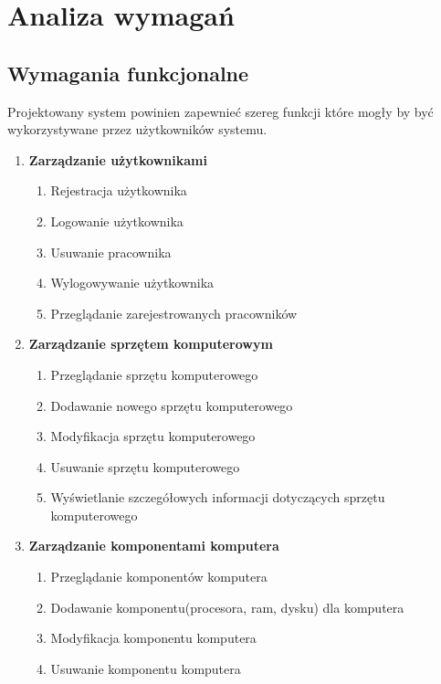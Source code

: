 \chapter{Analiza wymagań}

\section{Wymagania funkcjonalne}

Projektowany system powinien zapewnieć szereg funkcji które mogły by być wykorzystywane przez użytkowników systemu.
\begin{enumerate}[label={\textbf{FR}-\bfseries\arabic*}]
    \item \textbf{Zarządzanie użytkownikami}
    \begin{enumerate}[label={FR-\arabic{enumi}.\arabic*},noparskip]
        \item Rejestracja użytkownika
        \item Logowanie użytkownika
        \item Usuwanie pracownika
        \item Wylogowywanie użytkownika
				\item Przeglądanie zarejestrowanych pracowników
    \end{enumerate}
		
		\item \textbf{Zarządzanie sprzętem komputerowym}
    \begin{enumerate}[label={FR-\arabic{enumi}.\arabic*},noparskip]
        \item Przeglądanie sprzętu komputerowego
        \item Dodawanie nowego sprzętu komputerowego
        \item Modyfikacja sprzętu komputerowego
        \item Usuwanie sprzętu komputerowego
				\item Wyświetlanie szczegółowych informacji dotyczących sprzętu komputerowego
		\end{enumerate}
		
		\item \textbf{Zarządzanie komponentami komputera}
			\begin{enumerate}[label={FR-\arabic{enumi}.\arabic*},noparskip]		
				\item Przeglądanie komponentów komputera
				\item Dodawanie komponentu(procesora, ram, dysku) dla komputera
				\item Modyfikacja komponentu komputera
				\item Usuwanie komponentu komputera
    \end{enumerate}
		

\end{enumerate}
